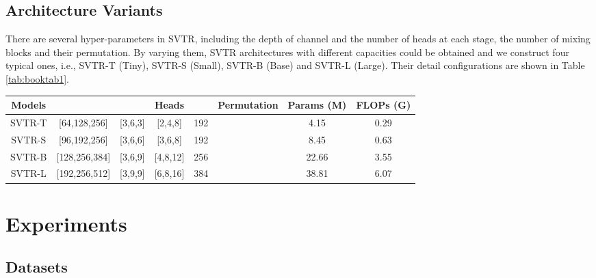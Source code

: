 \documentclass{article}
\begin{document}
\subsection{Architecture Variants}
There are several hyper-parameters in SVTR, including the depth of channel and the number of heads at each stage, the number of mixing blocks and their permutation. By varying them, SVTR architectures with different capacities could be obtained and we construct four typical ones, i.e., SVTR-T (Tiny), SVTR-S (Small), SVTR-B (Base) and SVTR-L (Large). Their detail configurations are shown in Table \ref{tab:booktab1}.


\begin{table*}[t]
\centering
\begin{tabular}{c|c|c|c|c|c|cc}
\toprule
Models &  &  & Heads        &   & Permutation & Params (M) & FLOPs (G) \\
\midrule
SVTR-T & {[}64,128,256{]}  & {[}3,6,3{]}      & {[}2,4,8{]}  & 192 &   & 4.15   & 0.29  \\
SVTR-S & {[}96,192,256{]}  & {[}3,6,6{]}      & {[}3,6,8{]}  & 192 &  & 8.45   & 0.63  \\
SVTR-B & {[}128,256,384{]} & {[}3,6,9{]}      & {[}4,8,12{]} & 256 &   & 22.66        &  3.55  \\
SVTR-L & {[}192,256,512{]} & {[}3,9,9{]}      & {[}6,8,16{]} & 384 &  & 38.81  & 6.07 \\
\bottomrule
\end{tabular}
\caption{Architecture specifications of SVTR variants (w/o counting the rectification module and linear classifier).}
\label{tab:booktab1}
\end{table*}  


\section{Experiments}

\subsection{Datasets}
\end{document}
